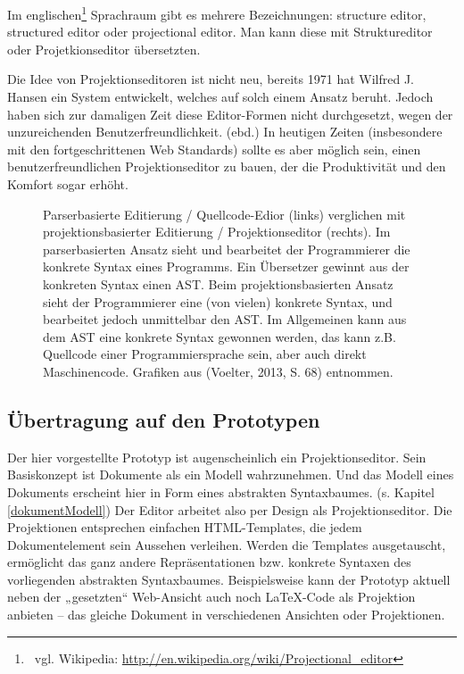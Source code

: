  
Im englischen\footnote{~vgl. Wikipedia: \url{http://en.wikipedia.org/wiki/Projectional\_editor}} Sprachraum gibt es mehrere Bezeichnungen: structure editor, structured editor oder projectional editor. Man kann diese mit Struktureditor oder Projetkionseditor übersetzten.

 
Die Idee von Projektionseditoren ist nicht neu, bereits 1971 hat Wilfred J. Hansen ein System entwickelt, welches auf solch einem Ansatz beruht. \citep[S.~91]{Gomolka} Jedoch haben sich zur damaligen Zeit diese Editor-Formen nicht durchgesetzt, wegen der unzureichenden Benutzerfreundlichkeit. (ebd.) In heutigen Zeiten (insbesondere mit den fortgeschrittenen Web Standards) sollte es aber möglich sein, einen benutzerfreundlichen Projektionseditor zu bauen, der die Produktivität und den Komfort sogar erhöht.

 
\begin{figure}[h!]
\centering
\advance\leftskip-2.5cm
\caption[Parserbasierte versus projektionsbasierte Editierung]{ Parserbasierte Editierung / Quellcode-Edior (links) verglichen mit projektionsbasierter Editierung / Projektionseditor (rechts). Im parserbasierten Ansatz sieht und bearbeitet der Programmierer die konkrete Syntax eines Programms. Ein Übersetzer gewinnt aus der konkreten Syntax einen AST. Beim projektionsbasierten Ansatz sieht der Programmierer eine (von vielen) konkrete Syntax, und bearbeitet jedoch unmittelbar den AST. Im Allgemeinen kann aus dem AST eine konkrete Syntax gewonnen werden, das kann z.B. Quellcode einer Programmiersprache sein, aber auch direkt Maschinencode. Grafiken aus (Voelter, 2013, S. 68) entnommen. }\label{parserprojectional}
\end{figure}
 
\subsection{Übertragung auf den Prototypen}\label{}
 
Der hier vorgestellte Prototyp ist augenscheinlich ein Projektionseditor. Sein Basiskonzept ist Dokumente als ein Modell wahrzunehmen. Und das Modell eines Dokuments erscheint hier in Form eines abstrakten Syntaxbaumes. (s. Kapitel \ref{dokumentModell}) Der Editor arbeitet also per Design als Projektionseditor. Die Projektionen entsprechen einfachen HTML-Templates, die jedem Dokumentelement sein Aussehen verleihen. Werden die Templates ausgetauscht, ermöglicht das ganz andere Repräsentationen bzw. konkrete Syntaxen des vorliegenden abstrakten Syntaxbaumes. Beispielsweise kann der Prototyp aktuell neben der „gesetzten“ Web-Ansicht auch noch LaTeX-Code als Projektion anbieten -- das gleiche Dokument in verschiedenen Ansichten oder Projektionen.

